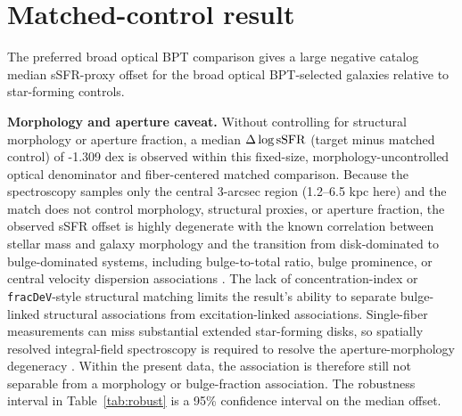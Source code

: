 \documentclass[twocolumn]{aastex631}
\begin{document}
\section{Matched-control result}
The preferred broad optical BPT comparison gives a large negative catalog median sSFR-proxy offset for the broad optical BPT-selected galaxies relative to star-forming controls.
    \par\noindent\textbf{Morphology and aperture caveat.} Without controlling for structural morphology or aperture fraction, a median $\Delta\log {\rm sSFR}$ (target minus matched control) of -1.309 dex is observed within this fixed-size, morphology-uncontrolled optical denominator and fiber-centered matched comparison. Because the spectroscopy samples only the central 3-arcsec region (1.2--6.5 kpc here) and the match does not control morphology, structural proxies, or aperture fraction, the observed sSFR offset is highly degenerate with the known correlation between stellar mass and galaxy morphology and the transition from disk-dominated to bulge-dominated systems, including bulge-to-total ratio, bulge prominence, or central velocity dispersion associations \citep{schawinski2010,bluck2014,piotrowska2022}. The lack of concentration-index or \texttt{fracDeV}-style structural matching limits the result's ability to separate bulge-linked structural associations from excitation-linked associations. Single-fiber measurements can miss substantial extended star-forming disks, so spatially resolved integral-field spectroscopy is required to resolve the aperture-morphology degeneracy \citep{penny2018,cheung2016,bundy2015,canodiaz2016}. Within the present data, the association is therefore still not separable from a morphology or bulge-fraction association. The robustness interval in Table~\ref{tab:robust} is a 95\% confidence interval on the median offset.
\end{document}
